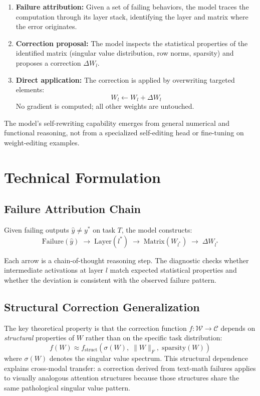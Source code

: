 \documentclass[10pt,twocolumn]{article}
\begin{document}
\begin{enumerate}[leftmargin=1.5em,itemsep=2pt]
  \item \textbf{Failure attribution:} Given a set of failing behaviors, the model traces the computation through its layer stack, identifying the layer and matrix where the error originates.
  \item \textbf{Correction proposal:} The model inspects the statistical properties of the identified matrix (singular value distribution, row norms, sparsity) and proposes a correction $\Delta W_l$.
  \item \textbf{Direct application:} The correction is applied by overwriting targeted elements:
  \[
    W_l \leftarrow W_l + \Delta W_l
  \]
  No gradient is computed; all other weights are untouched.
\end{enumerate}

The model's self-rewriting capability emerges from general numerical and functional reasoning, not from a specialized self-editing head or fine-tuning on weight-editing examples.

\section{Technical Formulation}

\subsection*{Failure Attribution Chain}

Given failing outputs $\hat{y} \neq y^*$ on task $T$, the model constructs:
\begin{equation}
\text{Failure}(\hat{y}) \;\to\; \text{Layer}(l^*) \;\to\; \text{Matrix}(W_{l^*}) \;\to\; \Delta W_{l^*}
\label{eq:chain}
\end{equation}

Each arrow is a chain-of-thought reasoning step.
The diagnostic checks whether intermediate activations at layer $l$ match expected statistical properties and whether the deviation is consistent with the observed failure pattern.

\subsection*{Structural Correction Generalization}

The key theoretical property is that the correction function $f: \mathcal{W} \to \mathcal{C}$ depends on \emph{structural} properties of $W$ rather than on the specific task distribution:
\begin{equation}
f(W) \approx f_{\mathrm{struct}}\!\left(\sigma(W),\;\|W\|_F,\;\text{sparsity}(W)\right)
\label{eq:struct}
\end{equation}
where $\sigma(W)$ denotes the singular value spectrum.
This structural dependence explains cross-modal transfer: a correction derived from text-math failures applies to visually analogous attention structures because those structures share the same pathological singular value pattern.
\end{document}
